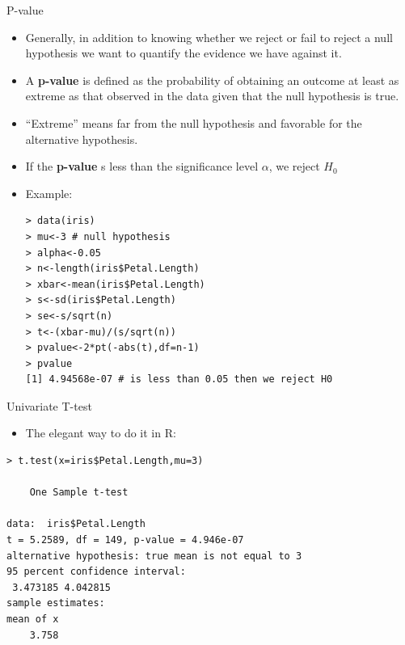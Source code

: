 \documentclass[handout]{beamer}
\begin{document}
\begin{frame}[fragile]{P-value}
\scriptsize{
\begin{itemize}
 \item Generally, in addition to knowing whether we reject or fail to reject a null hypothesis we want to quantify the evidence we have against it.
 \item A \textbf{p-value} is defined as the probability of obtaining an outcome at least as extreme as that observed in the data given that the null hypothesis is true.
 \item ``Extreme'' means far from the null hypothesis and favorable for the alternative hypothesis.
 \item If the \textbf{p-value} s less than the significance level $\alpha$, we reject $H_{0}$ 
 \item Example:
\begin{verbatim}
> data(iris)
> mu<-3 # null hypothesis
> alpha<-0.05
> n<-length(iris$Petal.Length)
> xbar<-mean(iris$Petal.Length)
> s<-sd(iris$Petal.Length)
> se<-s/sqrt(n)
> t<-(xbar-mu)/(s/sqrt(n))
> pvalue<-2*pt(-abs(t),df=n-1)
> pvalue
[1] 4.94568e-07 # is less than 0.05 then we reject H0
\end{verbatim}
\end{itemize}

 


}
\end{frame}

\begin{frame}[fragile]{Univariate T-test}
\scriptsize{
\begin{itemize}
 \item The elegant way to do it in R:
\end{itemize}

\begin{verbatim}
> t.test(x=iris$Petal.Length,mu=3)

	One Sample t-test

data:  iris$Petal.Length 
t = 5.2589, df = 149, p-value = 4.946e-07
alternative hypothesis: true mean is not equal to 3 
95 percent confidence interval:
 3.473185 4.042815 
sample estimates:
mean of x 
    3.758 
\end{verbatim}
}



\end{frame}
\end{document}
